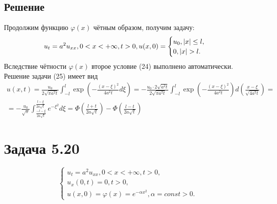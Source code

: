 \documentclass[11pt]{article}
\begin{document}
\subsection{Решение}
\label{sec:org8eee633}
Продолжим функцию $\varphi(x)$ чётным образом, получим задачу:
\begin{equation}
u_t = a^2u_{xx}, 0 < x < +\infty, t > 0, \\
u(x, 0) = \begin{cases}
u_0, |x| \leq l, \\
0, |x| > l.
\end{cases}
\end{equation}
Вследствие чётности $\varphi(x)$ второе условие (24) выполнено автоматически. Решение задачи
(25) имеет вид
\begin{multline}
u(x, t) = \frac{u_0}{2\sqrt{\pi a^2t}}\int_{-l}^l\exp\left(-\frac{(x - \xi)^2}{4a^2t}d\xi\right) =
-\frac{u_0\cdot2\sqrt{a^2t}}{2\sqrt{\pi a^2t}}\int_{-l}^l\exp\left(-\frac{(x - \xi)^2}{4a^2t}\right)d\left(\frac{x - \xi}{\sqrt{4a^2t}}\right) = \\
= -\frac{u_0}{\sqrt{\pi}}\int_{\frac{-l-\xi}{2a\sqrt{t}}}^{\frac{l-\xi}{2a\sqrt{t}}}e^{-\xi^2}d\xi = 
\Phi\left(\frac{l + t}{2a\sqrt{t}}\right) - \Phi\left(\frac{l - t}{2a\sqrt{t}}\right)
\end{multline}
\section{Задача 5.20}
\label{sec:orgc7ba574}
\begin{equation}
\begin{cases}
u_t = a^2u_{xx}, 0 < x < +\infty, t > 0, \\
u_x(0, t) = 0, t > 0, \\
u(x, 0) = \varphi(x) = e^{-\alpha x^2}, \alpha = const > 0.
\end{cases}
\end{equation}
\end{document}
